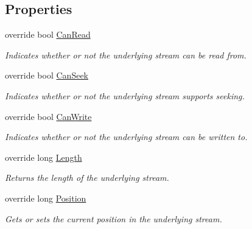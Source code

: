 \subsection*{Properties}
\begin{DoxyCompactItemize}
\item 
override bool \hyperlink{class_p_http_1_1_http_output_stream_a4aa9c138e2d4228f179b5e615016b90e}{Can\+Read}
\begin{DoxyCompactList}\small\item\em Indicates whether or not the underlying stream can be read from. \end{DoxyCompactList}\item 
override bool \hyperlink{class_p_http_1_1_http_output_stream_ad098665c35a75ffae7b6a1bd60f5f922}{Can\+Seek}
\begin{DoxyCompactList}\small\item\em Indicates whether or not the underlying stream supports seeking. \end{DoxyCompactList}\item 
override bool \hyperlink{class_p_http_1_1_http_output_stream_a0ce0f653423645a055daea15d6f726a7}{Can\+Write}
\begin{DoxyCompactList}\small\item\em Indicates whether or not the underlying stream can be written to. \end{DoxyCompactList}\item 
override long \hyperlink{class_p_http_1_1_http_output_stream_abbc51e3cac2c8e5db155fd82d9c08a7c}{Length}
\begin{DoxyCompactList}\small\item\em Returns the length of the underlying stream. \end{DoxyCompactList}\item 
override long \hyperlink{class_p_http_1_1_http_output_stream_a1903fe514b1ed10c401645cef861d9c2}{Position}
\begin{DoxyCompactList}\small\item\em Gets or sets the current position in the underlying stream. \end{DoxyCompactList}\end{DoxyCompactItemize}


